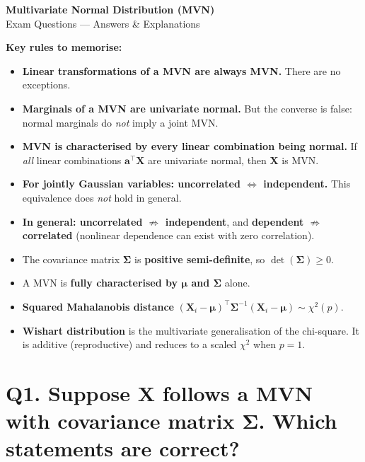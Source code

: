 \documentclass[12pt, a4paper]{article}
\begin{document}
\begin{center}
  {\LARGE \textbf{Multivariate Normal Distribution (MVN)}}\\[0.3em]
  {\large Exam Questions --- Answers \& Explanations}
\end{center}
\vspace{1em}

\textbf{Key rules to memorise:}
\begin{itemize}[itemsep=4pt]
  \item \textbf{Linear transformations of a MVN are always MVN.} There are no exceptions.
  \item \textbf{Marginals of a MVN are univariate normal.} But the converse is false: normal marginals do \textit{not} imply a joint MVN.
  \item \textbf{MVN is characterised by every linear combination being normal.} If \textit{all} linear combinations $\mathbf{a}^\top \mathbf{X}$ are univariate normal, then $\mathbf{X}$ is MVN.
  \item \textbf{For jointly Gaussian variables: uncorrelated $\Leftrightarrow$ independent.} This equivalence does \textit{not} hold in general.
  \item \textbf{In general: uncorrelated $\not\Rightarrow$ independent}, and \textbf{dependent $\not\Rightarrow$ correlated} (nonlinear dependence can exist with zero correlation).
  \item The covariance matrix $\boldsymbol{\Sigma}$ is \textbf{positive semi-definite}, so $\det(\boldsymbol{\Sigma}) \geq 0$.
  \item A MVN is \textbf{fully characterised by $\boldsymbol{\mu}$ and $\boldsymbol{\Sigma}$} alone.
  \item \textbf{Squared Mahalanobis distance} $(\mathbf{X}_i - \boldsymbol{\mu})^\top \boldsymbol{\Sigma}^{-1} (\mathbf{X}_i - \boldsymbol{\mu}) \sim \chi^2(p)$.
  \item \textbf{Wishart distribution} is the multivariate generalisation of the chi-square. It is additive (reproductive) and reduces to a scaled $\chi^2$ when $p=1$.
\end{itemize}

\vspace{1.5em}

\section*{Q1. Suppose $\mathbf{X}$ follows a MVN with covariance matrix $\boldsymbol{\Sigma}$. Which statements are correct?}
\end{document}
